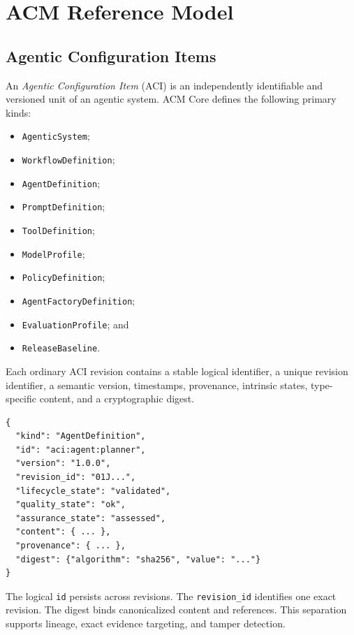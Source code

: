 \documentclass[10pt]{article}
\begin{document}
\section{ACM Reference Model}
\label{sec:model}

\subsection{Agentic Configuration Items}

An \emph{Agentic Configuration Item} (ACI) is an independently identifiable and versioned unit of an agentic system. ACM Core defines the following primary kinds:

\begin{itemize}[leftmargin=*]
  \item \texttt{AgenticSystem};
  \item \texttt{WorkflowDefinition};
  \item \texttt{AgentDefinition};
  \item \texttt{PromptDefinition};
  \item \texttt{ToolDefinition};
  \item \texttt{ModelProfile};
  \item \texttt{PolicyDefinition};
  \item \texttt{AgentFactoryDefinition};
  \item \texttt{EvaluationProfile}; and
  \item \texttt{ReleaseBaseline}.
\end{itemize}

Each ordinary ACI revision contains a stable logical identifier, a unique revision identifier, a semantic version, timestamps, provenance, intrinsic states, type-specific content, and a cryptographic digest.

\begin{lstlisting}[style=acmcode,caption={Simplified ACI revision.}]
{
  "kind": "AgentDefinition",
  "id": "aci:agent:planner",
  "version": "1.0.0",
  "revision_id": "01J...",
  "lifecycle_state": "validated",
  "quality_state": "ok",
  "assurance_state": "assessed",
  "content": { ... },
  "provenance": { ... },
  "digest": {"algorithm": "sha256", "value": "..."}
}
\end{lstlisting}

The logical \texttt{id} persists across revisions. The \texttt{revision\_id} identifies one exact revision. The digest binds canonicalized content and references. This separation supports lineage, exact evidence targeting, and tamper detection.
\end{document}
